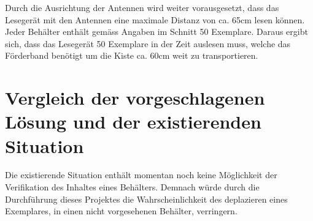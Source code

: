 Durch die Ausrichtung der Antennen wird weiter vorausgesetzt, dass das Lesegerät mit den Antennen eine maximale Distanz von ca. 65cm lesen können. Jeder Behälter enthält gemäss Angaben im Schnitt 50 Exemplare. Daraus ergibt sich, dass das Lesegerät 50 Exemplare in der Zeit auslesen muss, welche das Förderband benötigt um die Kiste ca. 60cm weit zu transportieren.

\section{Vergleich der vorgeschlagenen Lösung und der existierenden Situation}
Die existierende Situation enthält momentan noch keine Möglichkeit der Verifikation des Inhaltes eines Behälters. Demnach würde durch die Durchführung dieses Projektes die Wahrscheinlichkeit des deplazieren eines Exemplares, in einen nicht vorgesehenen Behälter, verringern.

